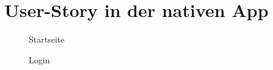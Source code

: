 \section{User-Story in der nativen App}
\label{sec:UserStory}
\setlength{\fboxsep}{0pt}%
\setlength{\fboxrule}{1pt}%
\begin{figure}[!h]
\centering
{}
\caption{Startseite}
\label{pic:natAppStartseite}
\end{figure}
\begin{figure}[!h]
\centering
{}
\caption{Login}
\label{pic:natAppLogin}
\end{figure}
